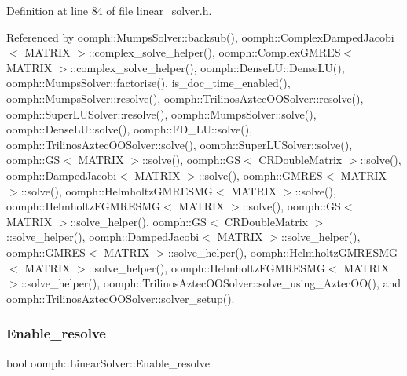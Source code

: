 Definition at line 84 of file linear\+\_\+solver.\+h.



Referenced by oomph\+::\+Mumps\+Solver\+::backsub(), oomph\+::\+Complex\+Damped\+Jacobi$<$ M\+A\+T\+R\+I\+X $>$\+::complex\+\_\+solve\+\_\+helper(), oomph\+::\+Complex\+G\+M\+R\+E\+S$<$ M\+A\+T\+R\+I\+X $>$\+::complex\+\_\+solve\+\_\+helper(), oomph\+::\+Dense\+L\+U\+::\+Dense\+L\+U(), oomph\+::\+Mumps\+Solver\+::factorise(), is\+\_\+doc\+\_\+time\+\_\+enabled(), oomph\+::\+Mumps\+Solver\+::resolve(), oomph\+::\+Trilinos\+Aztec\+O\+O\+Solver\+::resolve(), oomph\+::\+Super\+L\+U\+Solver\+::resolve(), oomph\+::\+Mumps\+Solver\+::solve(), oomph\+::\+Dense\+L\+U\+::solve(), oomph\+::\+F\+D\+\_\+\+L\+U\+::solve(), oomph\+::\+Trilinos\+Aztec\+O\+O\+Solver\+::solve(), oomph\+::\+Super\+L\+U\+Solver\+::solve(), oomph\+::\+G\+S$<$ M\+A\+T\+R\+I\+X $>$\+::solve(), oomph\+::\+G\+S$<$ C\+R\+Double\+Matrix $>$\+::solve(), oomph\+::\+Damped\+Jacobi$<$ M\+A\+T\+R\+I\+X $>$\+::solve(), oomph\+::\+G\+M\+R\+E\+S$<$ M\+A\+T\+R\+I\+X $>$\+::solve(), oomph\+::\+Helmholtz\+G\+M\+R\+E\+S\+M\+G$<$ M\+A\+T\+R\+I\+X $>$\+::solve(), oomph\+::\+Helmholtz\+F\+G\+M\+R\+E\+S\+M\+G$<$ M\+A\+T\+R\+I\+X $>$\+::solve(), oomph\+::\+G\+S$<$ M\+A\+T\+R\+I\+X $>$\+::solve\+\_\+helper(), oomph\+::\+G\+S$<$ C\+R\+Double\+Matrix $>$\+::solve\+\_\+helper(), oomph\+::\+Damped\+Jacobi$<$ M\+A\+T\+R\+I\+X $>$\+::solve\+\_\+helper(), oomph\+::\+G\+M\+R\+E\+S$<$ M\+A\+T\+R\+I\+X $>$\+::solve\+\_\+helper(), oomph\+::\+Helmholtz\+G\+M\+R\+E\+S\+M\+G$<$ M\+A\+T\+R\+I\+X $>$\+::solve\+\_\+helper(), oomph\+::\+Helmholtz\+F\+G\+M\+R\+E\+S\+M\+G$<$ M\+A\+T\+R\+I\+X $>$\+::solve\+\_\+helper(), oomph\+::\+Trilinos\+Aztec\+O\+O\+Solver\+::solve\+\_\+using\+\_\+\+Aztec\+O\+O(), and oomph\+::\+Trilinos\+Aztec\+O\+O\+Solver\+::solver\+\_\+setup().

\mbox{\label{classoomph_1_1LinearSolver_a5f5e7e7a44ff0897b0e4cd9524000edc}} 
\subsubsection{\texorpdfstring{Enable\+\_\+resolve}{Enable\_resolve}}
{\footnotesize\ttfamily bool oomph\+::\+Linear\+Solver\+::\+Enable\+\_\+resolve\hspace{0.3cm}{\ttfamily [protected]}}



